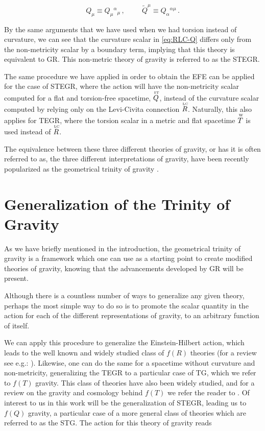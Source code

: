 \begin{equation}
    Q_\mu \equiv Q_\mu{}^\alpha{}_\mu \,, \hspace{1cm}
    \tilde{Q}^\mu \equiv Q_\alpha{}^{\alpha \mu} \,.
\end{equation}

\noindent By the same arguments that we have used when we had torsion instead of curvature, we can see that the curvature scalar in \cref{eq:RLC-Q} differs only from the non-metricity scalar by a boundary term, implying that this theory is equivalent to \gls{GR}. This non-metric theory of gravity is referred to as the \gls{STEGR}.

The same procedure we have applied in order to obtain the \gls{EFE} can be applied for the case of \gls{STEGR}, where the action will have the non-metricity scalar computed for a flat and torsion-free spacetime, $\overtext{ST}{Q}$, instead of the curvature scalar computed by relying only on the Levi-Civita connection $\overtext{LC}{R}$. Naturally, this also applies for \gls{TEGR}, where the torsion scalar in a metric and flat spacetime $\overtext{W}{T}$ is used instead of $\overtext{LC}{R}$.

The equivalence between these three different theories of gravity, or has it is often referred to as, the three different interpretations of gravity, have been recently popularized as the geometrical trinity of gravity \cite{Jimenez2019a}.


\section{Generalization of the Trinity of Gravity}

As we have briefly mentioned in the introduction, the geometrical trinity of gravity is a framework which one can use as a starting point to create modified theories of gravity, knowing that the advancements developed by \gls{GR} will be present.

Although there is a countless number of ways to generalize any given theory, perhaps the most simple way to do so is to promote the scalar quantity in the action for each of the different representations of gravity, to an arbitrary function of itself.

We can apply this procedure to generalize the Einstein-Hilbert action, which leads to the well known and widely studied class of $f(R)$ theories (for a review see e.g.: \cite{Felice2010}). Likewise, one can do the same for a spacetime without curvature and non-metricity, generalizing the \gls{TEGR} to a particular case of \gls{TG}, which we refer to $f(T)$ gravity. This class of theories have also been widely studied, and for a review on the gravity and cosmology behind $f(T)$ we refer the reader to \cite{Teleparallel-R2021}. Of interest to us in this work will be the generalization of \gls{STEGR}, leading us to $f(Q)$ gravity, a particular case of a more general class of theories which are referred to as the \gls{STG}. The action for this theory of gravity reads

